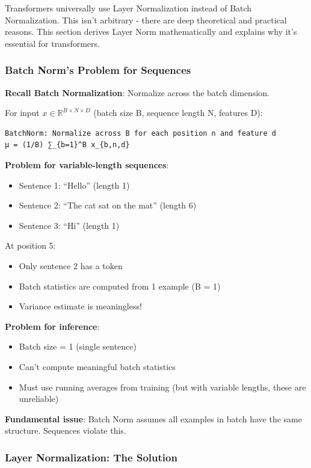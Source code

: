 \documentclass[11pt,oneside]{book}
\begin{document}
Transformers universally use Layer Normalization instead of Batch Normalization. This isn't arbitrary - there are deep theoretical and practical reasons. This section derives Layer Norm mathematically and explains why it's essential for transformers.

\subsubsection{Batch Norm's Problem for Sequences}

\textbf{Recall Batch Normalization}: Normalize across the batch dimension.

For input $x \in \mathbb{R}^{B \times N \times D}$ (batch size B, sequence length N, features D):
\begin{verbatim}
BatchNorm: Normalize across B for each position n and feature d
μ = (1/B) ∑_{b=1}^B x_{b,n,d}
\end{verbatim}

\textbf{Problem for variable-length sequences}:
\begin{itemize}
\item Sentence 1: ``Hello'' (length 1)
\item Sentence 2: ``The cat sat on the mat'' (length 6)
\item Sentence 3: ``Hi'' (length 1)
\end{itemize}

At position 5:
\begin{itemize}
\item Only sentence 2 has a token
\item Batch statistics are computed from 1 example (B = 1)
\item Variance estimate is meaningless!
\end{itemize}

\textbf{Problem for inference}:
\begin{itemize}
\item Batch size = 1 (single sentence)
\item Can't compute meaningful batch statistics
\item Must use running averages from training (but with variable lengths, these are unreliable)
\end{itemize}

\textbf{Fundamental issue}: Batch Norm assumes all examples in batch have the same structure. Sequences violate this.

\subsubsection{Layer Normalization: The Solution}
\end{document}

